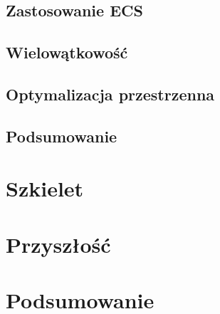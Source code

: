 \documentclass[11pt]{article}
\begin{document}
\subsection{Zastosowanie ECS}
\subsection{Wielowątkowość}
\subsection{Optymalizacja przestrzenna}
\subsection{Podsumowanie}

\section{Szkielet}

\section{Przyszłość}

\section{Podsumowanie}
\end{document}
